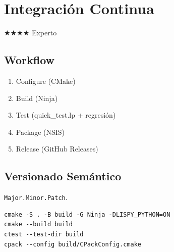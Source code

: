 \chapter{Integración Continua}
\label{chap:ci-release}
{\huge$\bigstar$}{\huge$\bigstar$}{\huge$\bigstar$}{\huge$\bigstar$} Experto

\section{Workflow}
\begin{enumerate}
\item Configure (CMake)
\item Build (Ninja)
\item Test (quick\_test.lp + regresión)
\item Package (NSIS)
\item Release (GitHub Releases)
\end{enumerate}

\section{Versionado Semántico}
\texttt{Major.Minor.Patch}.
\begin{verbatim}
cmake -S . -B build -G Ninja -DLISPY_PYTHON=ON
cmake --build build
ctest --test-dir build
cpack --config build/CPackConfig.cmake
\end{verbatim}

